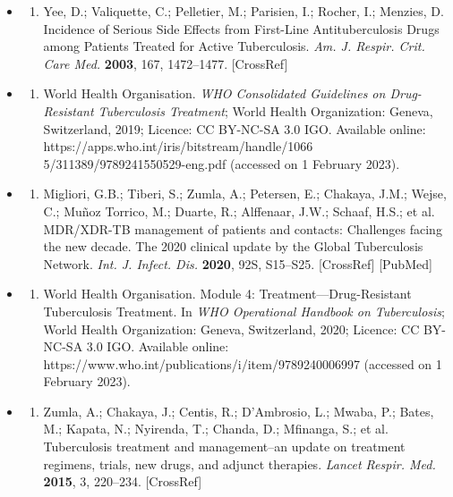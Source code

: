 \documentclass{article}
\begin{document}
\begin{itemize}
\item \begin{enumerate}
\item 
Yee, D.; Valiquette, C.; Pelletier, M.; Parisien, I.; Rocher, I.; Menzies, D. Incidence of Serious Side Effects from First-Line Antituberculosis Drugs among Patients Treated for Active Tuberculosis. \textit{Am. J. Respir. Crit. Care Med.} \textbf{2003}, 167, 1472–1477. [CrossRef]

\end{enumerate}

\item \begin{enumerate}
\item 
World Health Organisation. \textit{WHO Consolidated Guidelines on Drug-Resistant Tuberculosis Treatment}; World Health Organization: Geneva, Switzerland, 2019; Licence: CC BY-NC-SA 3.0 IGO. Available online: https://apps.who.int/iris/bitstream/handle/1066 5/311389/9789241550529-eng.pdf (accessed on 1 February 2023).

\end{enumerate}

\item \begin{enumerate}
\item 
Migliori, G.B.; Tiberi, S.; Zumla, A.; Petersen, E.; Chakaya, J.M.; Wejse, C.; Muñoz Torrico, M.; Duarte, R.; Alffenaar, J.W.; Schaaf, H.S.; et al. MDR/XDR-TB management of patients and contacts: Challenges facing the new decade. The 2020 clinical update by the Global Tuberculosis Network. \textit{Int. J. Infect. Dis.} \textbf{2020}, 92S, S15–S25. [CrossRef] [PubMed]

\end{enumerate}

\item \begin{enumerate}
\item 
World Health Organisation. Module 4: Treatment—Drug-Resistant Tuberculosis Treatment. In \textit{WHO Operational Handbook on Tuberculosis}; World Health Organization: Geneva, Switzerland, 2020; Licence: CC BY-NC-SA 3.0 IGO. Available online: https://www.who.int/publications/i/item/9789240006997 (accessed on 1 February 2023).

\end{enumerate}

\item \begin{enumerate}
\item 
Zumla, A.; Chakaya, J.; Centis, R.; D'Ambrosio, L.; Mwaba, P.; Bates, M.; Kapata, N.; Nyirenda, T.; Chanda, D.; Mfinanga, S.; et al. Tuberculosis treatment and management–an update on treatment regimens, trials, new drugs, and adjunct therapies. \textit{Lancet Respir. Med.} \textbf{2015}, 3, 220–234. [CrossRef]


\end{enumerate}
\end{itemize}
\end{document}
